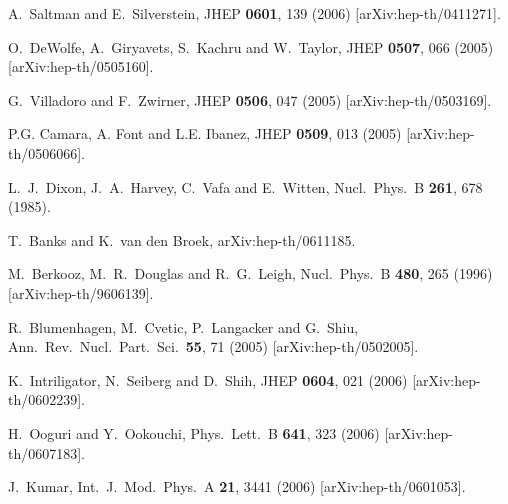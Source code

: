 \documentclass[aps,amsfonts]{ar2e}
\begin{document}
\begin{thebibliography}{999}
  A.~Saltman and E.~Silverstein,
  JHEP {\bf 0601}, 139 (2006)
  [arXiv:hep-th/0411271].

  O.~DeWolfe, A.~Giryavets, S.~Kachru and W.~Taylor,
  JHEP {\bf 0507}, 066 (2005)
  [arXiv:hep-th/0505160].

  G.~Villadoro and F.~Zwirner,
  JHEP {\bf 0506}, 047 (2005)
  [arXiv:hep-th/0503169].

P.G. Camara, A. Font and L.E. Ibanez, JHEP {\bf 0509}, 013 (2005)
[arXiv:hep-th/0506066].


  L.~J.~Dixon, J.~A.~Harvey, C.~Vafa and E.~Witten,
  Nucl.\ Phys.\ B {\bf 261}, 678 (1985).

  T.~Banks and K.~van den Broek,
  arXiv:hep-th/0611185.

  M.~Berkooz, M.~R.~Douglas and R.~G.~Leigh,
  Nucl.\ Phys.\ B {\bf 480}, 265 (1996)
  [arXiv:hep-th/9606139].

  R.~Blumenhagen, M.~Cvetic, P.~Langacker and G.~Shiu,
  Ann.\ Rev.\ Nucl.\ Part.\ Sci.\  {\bf 55}, 71 (2005)
  [arXiv:hep-th/0502005].

  K.~Intriligator, N.~Seiberg and D.~Shih,
  JHEP {\bf 0604}, 021 (2006)
  [arXiv:hep-th/0602239].

  H.~Ooguri and Y.~Ookouchi,
  Phys.\ Lett.\ B {\bf 641}, 323 (2006)
  [arXiv:hep-th/0607183].

  J.~Kumar,
  Int.\ J.\ Mod.\ Phys.\ A {\bf 21}, 3441 (2006)
  [arXiv:hep-th/0601053].


\end{thebibliography}
\end{document}
